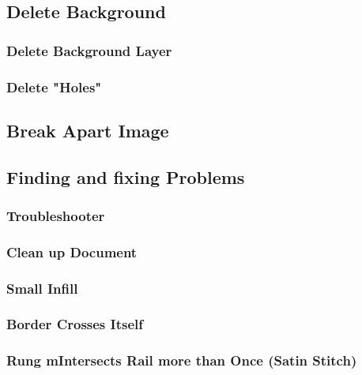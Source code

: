 \documentclass{article}
\begin{document}
        \subsection{Delete Background}

            \subsubsection{Delete Background Layer}

            \subsubsection{Delete "Holes"}

        \subsection{Break Apart Image}

        \subsection{Finding and fixing Problems}

            \subsubsection{Troubleshooter}

            \subsubsection{Clean up Document}

            \subsubsection{Small Infill}

            \subsubsection{Border Crosses Itself}

            \subsubsection{Rung mIntersects Rail more than Once (Satin Stitch)}
\end{document}
